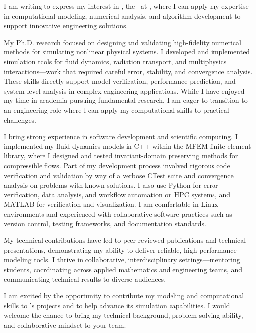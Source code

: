 I am writing to express my interest in 
\ifdefempty{\jobtitle}
  {\company,} %
  {the \jobtitle\ at \company,} %
where I can apply my expertise in computational modeling, numerical analysis, and algorithm development to support innovative engineering solutions.

My Ph.D. research focused on designing and validating high-fidelity numerical methods for simulating nonlinear physical systems. I developed and implemented simulation tools for fluid dynamics, radiation transport, and multiphysics interactions—work that required careful error, stability, and convergence analysis. These skills directly support model verification, performance prediction, and system-level analysis in complex engineering applications.
While I have enjoyed my time in academia pursuing fundamental research, I am eager to transition to an engineering role where I can apply my computational skills to practical challenges.

I bring strong experience in software development and scientific computing. 
I implemented my fluid dynamics models in C++ within the MFEM finite element library, where I designed and tested invariant-domain preserving methods for compressible flows. 
Part of my development process involved rigorous code verification and validation by way of a verbose CTest suite and convergence analysis on problems with known solutions. 
I also use Python for error verification, data analysis, and workflow automation on HPC systems, and MATLAB for verification and visualization. 
I am comfortable in Linux environments and experienced with collaborative software practices such as version control, testing frameworks, and documentation standards.

My technical contributions have led to peer-reviewed publications and technical presentations, demonstrating my ability to deliver reliable, high-performance modeling tools. I thrive in collaborative, interdisciplinary settings—mentoring students, coordinating across applied mathematics and engineering teams, and communicating technical results to diverse audiences.

I am excited by the opportunity to contribute my modeling and computational skills to \company's projects and to help advance its simulation capabilities. I would welcome the chance to bring my technical background, problem-solving ability, and collaborative mindset to your team.